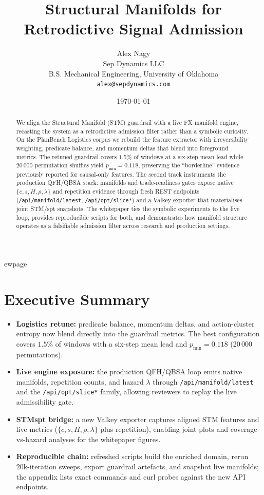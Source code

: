 \documentclass[11pt]{article}
\title{Structural Manifolds for Retrodictive Signal Admission}
\author{Alex Nagy\\Sep Dynamics LLC\\B.S. Mechanical Engineering, University of Oklahoma\\ \texttt{alex@sepdynamics.com}}
\date{\today}
\begin{document}
\maketitle

\begin{abstract}
We align the Structural Manifold (STM) guardrail with a live FX manifold engine,
recasting the system as a retrodictive admission filter rather than a symbolic
curiosity. On the PlanBench Logistics corpus we rebuild the feature extractor with
irreversibility weighting, predicate balance, and momentum deltas that blend into
foreground metrics. The retuned guardrail covers $1.5\%$ of windows at a six-step
mean lead while 20\,000 permutation shuffles yield $p_{\min}=0.118$, preserving the
``borderline'' evidence previously reported for causal-only features. The second
track instruments the production QFH/QBSA stack: manifolds and trade-readiness
gates expose native $\{c, s, H, \rho, \lambda\}$ and repetition evidence through
fresh REST endpoints (\texttt{/api/manifold/latest}, \texttt{/api/opt/slice*}) and a
Valkey exporter that materialises joint STM/spt snapshots. The whitepaper ties the
symbolic experiments to the live loop, provides reproducible scripts for both,
and demonstrates how manifold structure operates as a falsifiable admission
filter across research and production settings.
\end{abstract}

\tableofcontents

ewpage

\section*{Executive Summary}
\begin{sloppypar}
\begin{itemize}
  \item \textbf{Logistics retune:} predicate balance, momentum deltas, and action-cluster entropy now blend directly into the guardrail metrics. The best configuration covers $1.5\%$ of windows with a six-step mean lead and $p_{\min}=0.118$ (20\,000 permutations).
  \item \textbf{Live engine exposure:} the production QFH/QBSA loop emits native manifolds, repetition counts, and hazard $\lambda$ through \texttt{/api/manifold/latest} and the \texttt{/api/opt/slice*} family, allowing reviewers to replay the live admissibility gate.
  \item \textbf{STM\textrightarrow{}spt bridge:} a new Valkey exporter captures aligned STM features and live metrics ($\{c,s,H,\rho,\lambda\}$ plus repetition), enabling joint plots and coverage-vs-hazard analyses for the whitepaper figures.
  \item \textbf{Reproducible chain:} refreshed scripts build the enriched domain, rerun 20k-iteration sweeps, export guardrail artefacts, and snapshot live manifolds; the appendix lists exact commands and curl probes against the new API endpoints.
\end{itemize}
\end{sloppypar}
\end{document}
